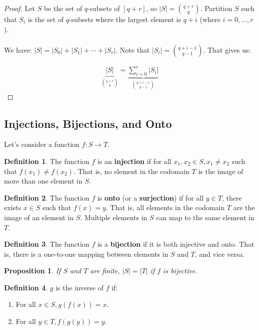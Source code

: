 \documentclass[]{article}
\newtheorem*{proposition}{Proposition}
\theoremstyle{definition}
\newtheorem*{defn}{Definition}
\newcommand{\lecture}[1]{\marginpar{{\footnotesize $\leftarrow$ \underline{#1}}}}
\begin{document}
				\begin{proof}
					Let $S$ be the set of $q$-subsets of $[q + r]$, so $|S| = {q + r \choose q}$. Partition $S$ such that $S_i$ is the set of $q$-subsets where the largest element is $q + i$ (where $i = 0, \ldots, r$).
					\\ \\
					We have: $|S| = |S_0| + |S_1| + \cdots + |S_r|$. Note that $|S_i| = {q + i - 1 \choose q - 1}$. That gives us:
					
					\begin{align*}
						\underbrace{|S|}_{{q + r \choose q}} = \underbrace{\sum_{i = 0}^{r} |S_i|}_{{q + i - 1 \choose q - 1}}
					\end{align*}
				\end{proof}
		
		\subsection{Injections, Bijections, and Onto} \lecture{January 11, 2013}
			Let's consider a function $f: S \to T$.
			\begin{defn}
				The function $f$ is an \textbf{injection} if for all $x_1, x_2 \in S, x_1 \ne x_2$ such that $f(x_1) \ne f(x_2)$. That is, no element in the codomain $T$ is the image of more than one element in $S$.
			\end{defn}

			\begin{defn}
				The function $f$ is \textbf{onto} (or a \textbf{surjection}) if for all $y \in T$, there exists $x \in S$ such that $f(x) = y$. That is, all elements in the codomain $T$ are the image of an element in $S$. Multiple elements in $S$ can map to the same element in $T$.
			\end{defn}

			\begin{defn}
				The function $f$ is a \textbf{bijection} if it is both injective and onto. That is, there is a one-to-one mapping between elements in $S$ and $T$, and vice versa.
			\end{defn}

			\begin{proposition}
				If $S$ and $T$ are finite, $|S| = |T|$ if $f$ is bijective.
			\end{proposition}
			
			\begin{defn}
				$g$ is the inverse of $f$ if:
				\begin{enumerate}
					\item For all $x \in S, g(f(x)) = x$.
					\item For all $y \in T, f(g(y)) = y$.
				\end{enumerate}
			\end{defn}
			
\end{document}
